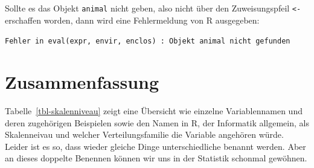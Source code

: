 \documentclass[
  letterpaper,
  DIV=11,
  oneside]{scrreport}
\begin{document}
Sollte es das Objekt \texttt{animal} nicht geben, also nicht über den
Zuweisungspfeil \texttt{\textless{}-} erschaffen worden, dann wird eine
Fehlermeldung von R ausgegeben:

\texttt{Fehler\ in\ eval(expr,\ envir,\ enclos)\ :\ Objekt\ \textquotesingle{}animal\textquotesingle{}\ nicht\ gefunden}

\hypertarget{zusammenfassung}{%
\section{Zusammenfassung}\label{zusammenfassung}}

{}

Tabelle~\ref{tbl-skalenniveau} zeigt eine Übersicht wie einzelne
Variablennamen und deren zugehörigen Beispielen sowie den Namen in R,
der Informatik allgemein, als Skalenneivau und welcher
Verteilungsfamilie die Variable angehören würde. Leider ist es so, dass
wieder gleiche Dinge unterschiedliche benannt werden. Aber an dieses
doppelte Benennen können wir uns in der Statistik schonmal gewöhnen.
\end{document}
